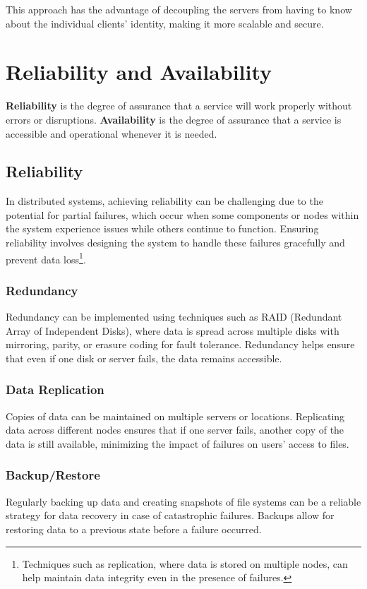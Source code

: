 \documentclass{report}
\newcommand{\definitionBegin}[1]{\begin{tcolorbox}[title={Definition: #1}]}
\newcommand{\definitionEnd}{\end{tcolorbox}}
\begin{document}
This approach has the advantage of decoupling the servers from having to know about the individual
clients' identity, making it more scalable and secure.





\section{Reliability and Availability}
\definitionBegin{Reliability and Availability}
\textbf{Reliability} is the degree of assurance that a service will work properly without errors or
disruptions.
\tcblower
\textbf{Availability} is the degree of assurance that a service is accessible and operational
whenever it is needed.
\definitionEnd


\subsection{Reliability}
In distributed systems, achieving reliability can be challenging due to the potential for partial
failures, which occur when some components or nodes within the system experience issues
while others continue to function. Ensuring reliability involves designing the system to handle
these failures gracefully and prevent data loss\footnote{Techniques such as replication, where data is
stored on multiple nodes, can help maintain data integrity even in the presence of failures.}.


\subsubsection{Redundancy}
Redundancy can be implemented using techniques such as RAID (Redundant Array of Independent Disks),
where data is spread across multiple disks with mirroring, parity, or erasure coding for fault
tolerance. Redundancy helps ensure that even if one disk or server fails, the data remains
accessible.

\subsubsection{Data Replication}
Copies of data can be maintained on multiple servers or locations. Replicating data across different
nodes ensures that if one server fails, another copy of the data is still available, minimizing the
impact of failures on users' access to files. 


\subsubsection{Backup/Restore}
Regularly backing up data and creating snapshots of file systems can be a reliable strategy for data
recovery in case of catastrophic failures. Backups allow for restoring data to a previous state
before a failure occurred. 
\end{document}

